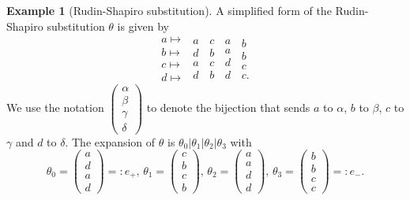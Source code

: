 \documentclass[12pt]{amsart}
\theoremstyle{definition}
\newtheorem{example}[theorem]{Example}
\numberwithin{equation}{section}
\renewcommand{\a}{{\color{blue}\boxdot}}
\renewcommand{\c}{{\color{red}\boxminus}}
\renewcommand{\b}{{\color{orange}\boxplus}}
\begin{document}
\begin{example}[Rudin-Shapiro substitution] \label{ex:RS} A simplified form of
the Rudin-Shapiro substitution $\theta$ is given by  
\[
\begin{array}{c} a \mapsto\\ b\mapsto\\ c\mapsto\\ d\mapsto \end{array} 
\begin{array}{c} a\,\\ d\,\\ a\,\\ d\, \end{array}
\!\!\!\!\!\!{\begin{array}{c} c\,\\ b\,\\ c\,\\ b\, \end{array}}
\!\!\!\!\!\!{\begin{array}{c} a\,\\ a\,\\ d\,\\ d\, \end{array}}
\!\!\!\!\!\!{\begin{array}{c} b\,\\ b\,\\ c\,\\ c. \end{array}}
\]
We use the notation $\begin{pmatrix}
           \alpha \\
           \beta \\
           \gamma \\ \delta
          \end{pmatrix} $
to denote the bijection that sends $a$ to $\alpha$, $b$ to $\beta$, $c$ to $\gamma$ and $d$ to $\delta$.
The expansion of $\theta$ is $\theta_0|\theta_1|\theta_2|\theta_3$ with \[\theta_0 = \begin{pmatrix} a\\d\\a\\d \end{pmatrix}=:e_+,  \, 
\theta_1 =  
\begin{pmatrix} 
c\\b\\c\\b \end{pmatrix}, \,\theta_2 =  \begin{pmatrix} a\\a\\d\\d \end{pmatrix} , \,\theta_3 =  \begin{pmatrix} b\\b\\c\\c \end{pmatrix}=:e_-.\]

\end{example}
\end{document}
